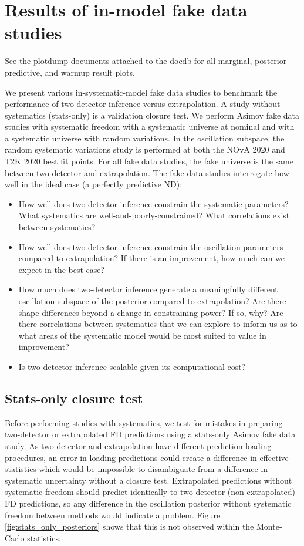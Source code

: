 \documentclass{article}
\begin{document}
\FloatBarrier
\section{Results of in-model fake data studies}
\label{sec:results_of_in_model_fake_data_studies}
See the plotdump documents attached to the docdb for all marginal, posterior predictive, and warmup result plots.

We present various in-systematic-model fake data studies to benchmark the performance of two-detector inference versus extrapolation. A study without systematics (stats-only) is a validation closure test. We perform Asimov fake data studies with systematic freedom with a systematic universe at nominal and with a systematic universe with random variations. In the oscillation subspace, the random systematic variations study is performed at both the NOvA 2020 and T2K 2020 best fit points. For all fake data studies, the fake universe is the same between two-detector and extrapolation. The fake data studies interrogate how well in the ideal case (a perfectly predictive ND):
\begin{itemize}
  \item How well does two-detector inference constrain the systematic parameters? What systematics are well-and-poorly-constrained? What correlations exist between systematics?
  \item How well does two-detector inference constrain the oscillation parameters compared to extrapolation? If there is an improvement, how much can we expect in the best case?
  \item How much does two-detector inference generate a meaningfully different oscillation subspace of the posterior compared to extrapolation? Are there shape differences beyond a change in constraining power? If so, why? Are there correlations between systematics that we can explore to inform us as to what areas of the systematic model would be most suited to value in improvement?
  \item Is two-detector inference scalable given its computational cost?
\end{itemize}

\subsection{Stats-only closure test}
\label{sec:stats_only_closure_test}
Before performing studies with systematics, we test for mistakes in preparing two-detector or extrapolated FD predictions using a stats-only Asimov fake data study. As two-detector and extrapolation have different prediction-loading procedures, an error in loading predictions could create a difference in effective statistics which would be impossible to disambiguate from a difference in systematic uncertainty without a closure test. Extrapolated predictions without systematic freedom should predict identically to two-detector (non-extrapolated) FD predictions, so any difference in the oscillation posterior without systematic freedom between methods would indicate a problem. Figure \ref{fig:stats_only_posteriors} shows that this is not observed within the Monte-Carlo statistics.
\end{document}
